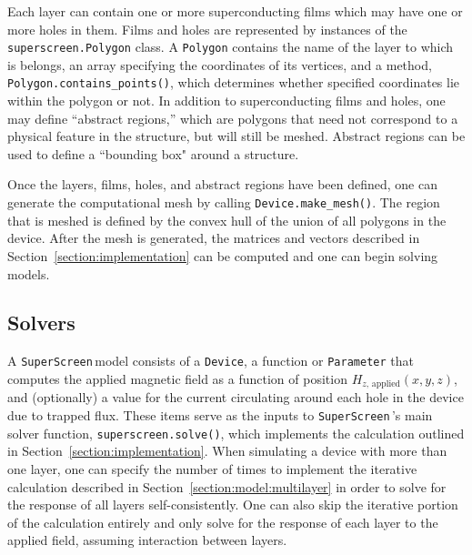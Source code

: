 \documentclass{article}
\newcommand{\SuperScreen}{\texttt{SuperScreen}\,}
\begin{document}
Each layer can contain one or more superconducting films which may have one or more holes in them. Films and holes are represented by instances of the \texttt{superscreen.Polygon} class. A \texttt{Polygon} contains the name of the layer to which is belongs, an array specifying the coordinates of its vertices, and a method, \texttt{Polygon.contains_points()}, which determines whether specified coordinates lie within the polygon or not. In addition to superconducting films and holes, one may define ``abstract regions,'' which are polygons that need not correspond to a physical feature in the structure, but will still be meshed. Abstract regions can be used to define a ``bounding box" around a structure.

Once the layers, films, holes, and abstract regions have been defined, one can generate the computational mesh by calling \texttt{Device.make_mesh()}. The region that is meshed is defined by the convex hull of the union of all polygons in the device. After the mesh is generated, the matrices and vectors described in Section~\ref{section:implementation} can be computed and one can begin solving models.

\subsection{Solvers}
\label{section:overview:solvers}

A \SuperScreen model consists of a \texttt{Device}, a function or \texttt{Parameter} that computes the applied magnetic field as a function of position $H_{z,\,\mathrm{applied}}(x, y, z)$, and (optionally) a value for the current circulating around each hole in the device due to trapped flux. These items serve as the inputs to \SuperScreen's main solver function, \texttt{superscreen.solve()}, which implements the calculation outlined in Section~\ref{section:implementation}. When simulating a device with more than one layer, one can specify the number of times to implement the iterative calculation described in Section~\ref{section:model:multilayer} in order to solve for the response of all layers self-consistently. One can also skip the iterative portion of the calculation entirely and only solve for the response of each layer to the applied field, assuming interaction between layers.
\end{document}
